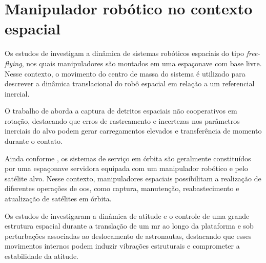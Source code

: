\section{Manipulador robótico no contexto espacial}
\label{sec_MR_espacial}

Os estudos de \cite{papadopoulos1994free} investigam a dinâmica de sistemas robóticos espaciais do tipo \textit{free-flying}, nos quais manipuladores são montados em uma espaçonave com base livre. 
Nesse contexto, o movimento do centro de massa do sistema é utilizado para descrever a dinâmica translacional do robô espacial em relação a um referencial inercial.

O trabalho de \cite{nishida2011strategy} aborda a captura de detritos espaciais não cooperativos em rotação, destacando que erros de rastreamento e incertezas nos parâmetros inerciais do alvo podem gerar carregamentos elevados e transferência de momento durante o contato.

Ainda conforme \cite{flores2014review}, os sistemas de serviço em órbita são geralmente constituídos por uma espaçonave servidora equipada com um manipulador robótico e pelo satélite alvo.
Nesse contexto, manipuladores espaciais possibilitam a realização de diferentes operações de \gls{oos}, como captura, manutenção, reabastecimento e atualização de satélites em órbita.

Os estudos de \cite{fonseca2016attitude} investigaram a dinâmica de atitude e o controle de uma grande estrutura espacial durante a translação de um \gls{mr} ao longo da plataforma e sob perturbações associadas ao deslocamento de astronautas, destacando que esses movimentos internos podem induzir vibrações estruturais e comprometer a estabilidade da atitude.

